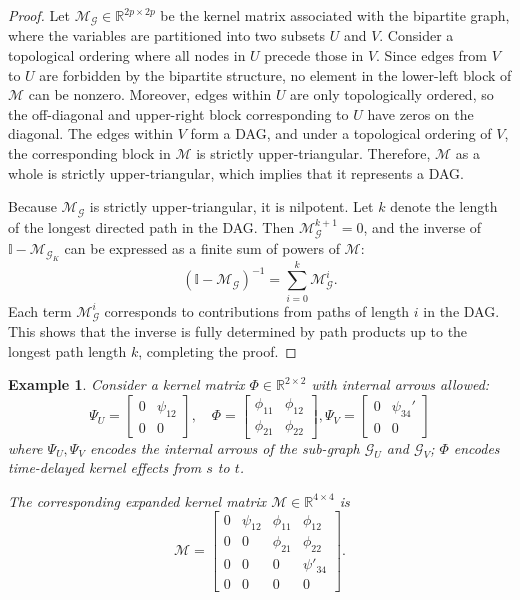 \documentclass[10pt]{article}
\numberwithin{figure}{section}
\newtheorem{example}{Example}
\begin{document}
\begin{proof}
Let $\mathcal{M}_{\mathcal{G}} \in \mathbb{R}^{2p \times 2p}$ be the kernel matrix associated with the bipartite graph, where the variables are partitioned into two subsets $U$ and $V$. Consider a topological ordering where all nodes in $U$ precede those in $V$. Since edges from $V$ to $U$ are forbidden by the bipartite structure, no element in the lower-left block of $\mathcal{M}$ can be nonzero. Moreover, edges within $U$ are only topologically ordered, so the off-diagonal and upper-right block corresponding to $U$ have zeros on the diagonal. The edges within $V$ form a DAG, and under a topological ordering of $V$, the corresponding block in $\mathcal{M}$ is strictly upper-triangular. Therefore, $\mathcal{M}$ as a whole is strictly upper-triangular, which implies that it represents a DAG.

Because $\mathcal{M}_{\mathcal{G}}$ is strictly upper-triangular, it is nilpotent. Let $k$ denote the length of the longest directed path in the DAG. Then $\mathcal{M}^{k+1}_{\mathcal{G}} = 0$, and the inverse of $\mathbb{I}-\mathcal{M}_{\mathcal{G}_K}$ can be expressed as a finite sum of powers of $\mathcal{M}$:
\[
(\mathbb{I} - \mathcal{M}_{\mathcal{G}})^{-1} = \sum_{i=0}^{k} \mathcal{M}_{\mathcal{G}}^i.
\]
Each term $\mathcal{M}^i_{\mathcal{G}}$ corresponds to contributions from paths of length $i$ in the DAG. This shows that the inverse is fully determined by path products up to the longest path length $k$, completing the proof.
\end{proof}
\begin{example}
Consider a kernel matrix $\Phi \in \mathbb{R}^{2\times 2}$ with internal arrows allowed:
\[
\Psi_U = 
\begin{bmatrix}
0 & \psi_{12} \\
0 & 0
\end{bmatrix}, 
\quad
\Phi = 
\begin{bmatrix}
\phi_{11} & \phi_{12} \\
\phi_{21} & \phi_{22}
\end{bmatrix},
\Psi_V = 
\begin{bmatrix}
0 & \psi_{34}' \\
0 & 0
\end{bmatrix}
\]
where $\Psi_U,\Psi_V$ encodes the internal arrows of the sub-graph $\mathscr{G}_U$ and $\mathscr{G}_V$; $\Phi$ encodes time-delayed kernel effects from $s$ to $t$.

The corresponding expanded kernel matrix $\mathcal{M} \in \mathbb{R}^{4 \times 4}$ is
\[
\mathcal{M} =
\begin{bmatrix}
0 & \psi_{12} & \phi_{11} & \phi_{12} \\
0 & 0        & \phi_{21} & \phi_{22} \\
0 & 0        & 0         & \psi'_{34} \\
0 & 0        & 0         & 0
\end{bmatrix}.
\]
\end{example}
\end{document}
